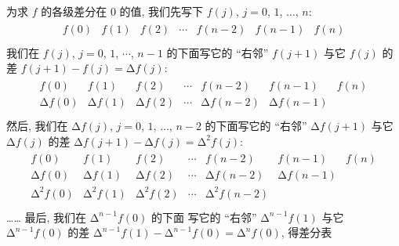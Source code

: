 \documentclass[../libro.tex]{subfiles}
\begin{document}
为求 \(f\) 的各级差分在 \(0\) 的值, 我们先写下
\(f(j)\), \(j = 0\), \(1\), \(\dots\), \(n\):
\begin{align*}
    \begin{matrix}
        f(0) & f(1) & f(2) & \cdots & f(n-2) & f(n-1) & f(n) \\
    \end{matrix}
\end{align*}
我们在 \(f(j)\), \(j = 0\), \(1\), \(\cdots\), \(n-1\)
的下面写它的 ``右邻'' \(f(j+1)\) 与它 \(f(j)\)
的差 \(f(j+1) - f(j) = \increment f(j)\):
\begin{align*}
    \begin{matrix}
        f(0)            & f(1)            & f(2)            & \cdots & f(n-2)            & f(n-1)            & f(n) \\
        \increment f(0) & \increment f(1) & \increment f(2) & \cdots & \increment f(n-2) & \increment f(n-1) & {}   \\
    \end{matrix}
\end{align*}
然后, 我们在 \(\increment f(j)\),
\(j = 0\), \(1\), \(\dots\), \(n-2\)
的下面写它的 ``右邻'' \(\increment f(j+1)\)
与它 \(\increment f(j)\)
的差 \(\increment f(j+1) - \increment f(j)
= \increment^2 f(j)\):
\begin{align*}
    \begin{matrix}
        f(0)              & f(1)              & f(2)              & \cdots & f(n-2)              & f(n-1)            & f(n) \\
        \increment f(0)   & \increment f(1)   & \increment f(2)   & \cdots & \increment f(n-2)   & \increment f(n-1) & {}   \\
        \increment^2 f(0) & \increment^2 f(1) & \increment^2 f(2) & \cdots & \increment^2 f(n-2) & {}                & {}   \\
    \end{matrix}
\end{align*}
……
最后, 我们在 \(\increment^{n-1} f(0)\) 的下面%
写它的 ``右邻'' \(\increment^{n-1} f(1)\)
与它 \(\increment^{n-1} f(0)\) 的差
\(\increment^{n-1} f(1) - \increment^{n-1} f(0)
= \increment^{n} f(0)\),
得差分表
\end{document}
